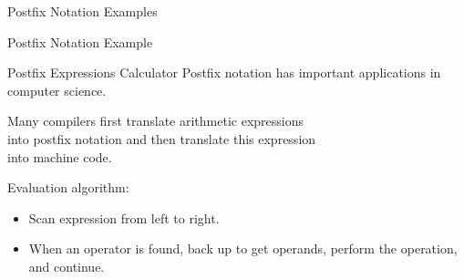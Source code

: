 \documentclass[14pt,aspectratio=1610]{beamer}
\begin{document}
\begin{frame}{Postfix Notation Examples}
\end{frame}

\begin{frame}{Postfix Notation Example}
\end{frame}

\begin{frame}{Postfix Expressions Calculator}
Postfix notation has important applications in\\ computer science.

Many compilers first translate arithmetic expressions\\ into postfix notation and then translate this expression\\ into machine code.

Evaluation algorithm:\vspace{-0.5em}
\begin{itemize}
  \item
    Scan expression from left to right.
  \item
    When an operator is found, back up to get operands, perform the operation, and continue.
\end{itemize}
\end{frame}
\end{document}
